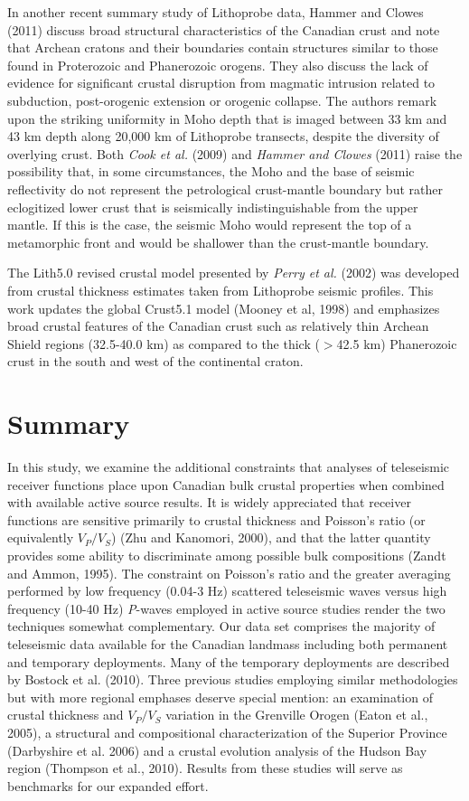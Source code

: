 \documentclass[msc,oneside]{ubcthesis}
\begin{document}
In another recent summary study of {\sc Lithoprobe} data, Hammer and Clowes (2011) discuss broad structural characteristics of the Canadian crust and note that Archean cratons and their boundaries contain structures similar to those found in Proterozoic and Phanerozoic orogens. They also discuss the lack of evidence for significant crustal disruption from magmatic intrusion related to subduction, post-orogenic extension or orogenic collapse. The authors remark upon the striking uniformity in Moho depth that is imaged between 33 km and 43 km depth along 20,000 km of {\sc Lithoprobe} transects, despite the diversity of overlying crust. Both {\it Cook et al.} (2009) and {\it Hammer and Clowes} (2011) raise the possibility that, in some circumstances, the Moho and the base of seismic reflectivity do not represent the petrological crust-mantle boundary but rather eclogitized lower crust that is seismically indistinguishable from the upper mantle. If this is the case, the seismic Moho would represent the top of a metamorphic front and would be shallower than the crust-mantle boundary.

The Lith5.0 revised crustal model presented by {\it Perry et al.} (2002) was developed from crustal thickness estimates taken from {\sc Lithoprobe} seismic profiles. This work updates the global Crust5.1 model (Mooney et al, 1998) and emphasizes broad crustal features of the Canadian crust such as relatively thin Archean Shield regions (32.5-40.0 km) as compared to the thick ($>$42.5 km) Phanerozoic crust in the south and west of the continental craton.

\section{Summary}
In this study, we examine the additional constraints that analyses of teleseismic receiver functions place upon Canadian bulk crustal properties when combined with available active source results. It is widely appreciated that receiver functions are sensitive primarily to crustal thickness and Poisson's ratio (or equivalently $V_P/V_S$) (Zhu and Kanomori, 2000), and that the latter quantity provides some ability to discriminate among possible bulk compositions (Zandt and Ammon, 1995). The constraint on Poisson's ratio and the greater averaging performed by low frequency (0.04-3 Hz) scattered teleseismic waves versus high frequency (10-40 Hz) {\it P}-waves employed in active source studies render the two techniques somewhat complementary. Our data set comprises the majority of teleseismic data available for the Canadian landmass including both permanent and temporary deployments. Many of the temporary deployments are described by Bostock et al. (2010). Three previous studies employing similar methodologies but with more regional emphases deserve special mention: an examination of crustal thickness and $V_P/V_S$ variation in the Grenville Orogen (Eaton et al., 2005), a structural and compositional characterization of the Superior Province (Darbyshire et al. 2006) and a crustal evolution analysis of the Hudson Bay region (Thompson et al., 2010). Results from these studies will serve as benchmarks for our expanded effort.
\end{document}
